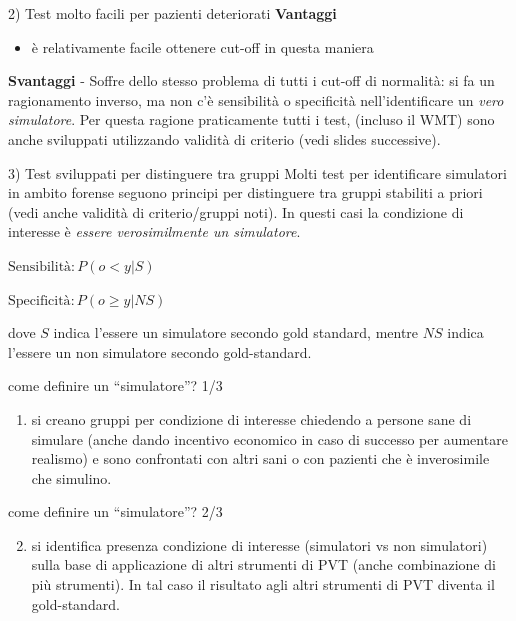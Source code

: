 \documentclass[
  ignorenonframetext,
  aspectratio=169,
]{beamer}
\providecommand{\tightlist}{%
  \setlength{\itemsep}{0pt}\setlength{\parskip}{0pt}}
\begin{document}
\begin{frame}{2) Test molto facili per pazienti deteriorati}
\label{test-molto-facili-per-pazienti-deteriorati-1}
\textbf{Vantaggi}

\begin{itemize}
\tightlist
\item
  è relativamente facile ottenere cut-off in questa maniera
\end{itemize}

\textbf{Svantaggi} - Soffre dello stesso problema di tutti i cut-off di
normalità: si fa un ragionamento inverso, ma non c'è sensibilità o
specificità nell'identificare un \emph{vero simulatore}. Per questa
ragione praticamente tutti i test, (incluso il WMT) sono anche
sviluppati utilizzando validità di criterio (vedi slides successive).
\end{frame}

\begin{frame}{3) Test sviluppati per distinguere tra gruppi}
\label{test-sviluppati-per-distinguere-tra-gruppi}
Molti test per identificare simulatori in ambito forense seguono
principi per distinguere tra gruppi stabiliti a priori (vedi anche
validità di criterio/gruppi noti). In questi casi la condizione di
interesse è \emph{essere verosimilmente un simulatore}.

\(\text{Sensibilità}: P(o < y | S)\)

\(\text{Specificità}: P(o \geq  y | NS)\)

dove \(S\) indica l'essere un simulatore secondo gold standard, mentre
\(NS\) indica l'essere un non simulatore secondo gold-standard.
\end{frame}

\begin{frame}{come definire un ``simulatore''? 1/3}
\label{come-definire-un-simulatore-13}
\small

\begin{enumerate}
\tightlist
\item
  si creano gruppi per condizione di interesse chiedendo a persone sane
  di simulare (anche dando incentivo economico in caso di successo per
  aumentare realismo) e sono confrontati con altri sani o con pazienti
  che è inverosimile che simulino.
\end{enumerate}
\end{frame}

\begin{frame}{come definire un ``simulatore''? 2/3}
\label{come-definire-un-simulatore-23}
\begin{enumerate}
\setcounter{enumi}{1}
\tightlist
\item
  si identifica presenza condizione di interesse (simulatori vs non
  simulatori) sulla base di applicazione di altri strumenti di PVT
  (anche combinazione di più strumenti). In tal caso il risultato agli
  altri strumenti di PVT diventa il gold-standard.
\end{enumerate}
\end{frame}
\end{document}
